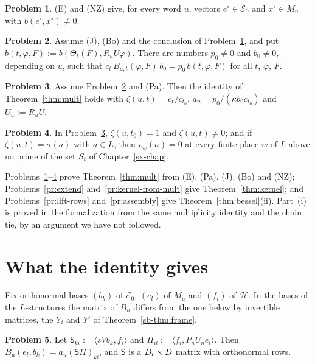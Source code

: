 \documentclass[reqno]{amsart}
\newcounter{chap}
\theoremstyle{definition}
\newtheorem{problem}{Problem}[section]
\theoremstyle{plain}
\theoremstyle{remark}
\newcommand{\Hc}{\mathcal H}
\newcommand{\Ec}{\mathcal E}
\begin{document}
\begin{problem}\label{pr:anchor-pair}
(E) and (NZ) give, for every word \(u\), vectors \(e^\circ\in\Ec_0\) and \(x^\circ\in M_u\) with \(b(e^\circ,x^\circ)\ne0\).
\end{problem}

\begin{problem}\label{pr:prop}
Assume (J), (Bo) and the conclusion of Problem~\ref{pr:anchor-pair}, and put \(b(t,\varphi,F):=b(\Theta_t(F),R_uU\varphi)\).  There are numbers \(p_0\ne0\) and \(b_0\ne0\), depending on \(u\), such that \(c_t\,B_{u,t}(\varphi,F)\,b_0=p_0\,b(t,\varphi,F)\) for all \(t\), \(\varphi\), \(F\).
\end{problem}

\begin{problem}\label{pr:mult-assembly}
Assume Problem~\ref{pr:prop} and (Pa).  Then the identity of Theorem~\ref{thm:mult} holds with \(\zeta(u,t)=c_t/c_{t_0}\), \(a_u=p_0/(\kappa b_0c_{t_0})\) and \(U_u:=R_uU\).
\end{problem}

\begin{problem}\label{pr:zeta}
In Problem~\ref{pr:mult-assembly}, \(\zeta(u,t_0)=1\) and \(\zeta(u,t)\ne0\); and if \(\zeta(u,t)=\sigma(a)\) with \(a\in L\), then \(v_w(a)=0\) at every finite place \(w\) of \(L\) above no prime of the set \(S_t\) of Chapter~\ref{sx-chap}.
\end{problem}

Problems~\ref{pr:anchor-pair}--\ref{pr:zeta} prove Theorem~\ref{thm:mult} from (E), (Pa), (J), (Bo) and (NZ); Problems~\ref{pr:extend} and~\ref{pr:kernel-from-mult} give Theorem~\ref{thm:kernel}; and Problems~\ref{pr:lift-rows} and~\ref{pr:assembly} give Theorem~\ref{thm:bessel}(ii).  Part~(i) is proved in the formalization from the same multiplicity identity and the chain tie, by an argument we have not followed.

\section{What the identity gives}\label{sec:use}

Fix orthonormal bases \((b_k)\) of \(\Ec_0\), \((e_l)\) of \(M_u\) and \((f_i)\) of \(\Hc\).  In the bases of the \(L\)-structures the matrix of \(B_u\) differs from the one below by invertible matrices, the \(Y_i\) and \(Y'\) of Theorem~\ref{sb-thm:frame}.

\begin{problem}\label{pr:matrix}
Let \(\mathsf S_{ki}:=\langle sVb_k,f_i\rangle\) and \(\Pi_{il}:=\langle f_i,P_uU_ue_l\rangle\).  Then \(B_u(e_l,b_k)=a_u(\mathsf S\Pi)_{kl}\), and \(\mathsf S\) is a \(D_{\rm r}\times D\) matrix with orthonormal rows.
\end{problem}
\end{document}
